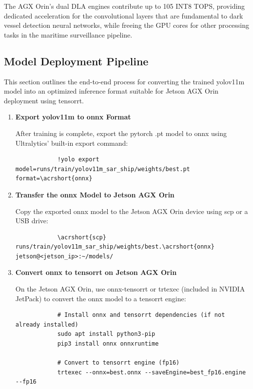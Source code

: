 \documentclass{article}
\begin{document}
	The AGX Orin's dual DLA engines contribute up to 105 INT8 TOPS, providing dedicated acceleration for the convolutional layers that are fundamental to dark vessel detection neural networks, while freeing the GPU cores for other processing tasks in the maritime surveillance pipeline.
	
	
	
	
	
	\subsection{Model Deployment Pipeline}
	This section outlines the end-to-end process for converting the trained \acrshort{yolov11m} model into an optimized inference format suitable for Jetson AGX Orin deployment using \acrshort{tensorrt}. \begin{enumerate}
		\item \textbf{Export \acrshort{yolov11m} to \acrshort{onnx} Format}
		
		After training is complete, export the \acrshort{pytorch} .pt model to \acrshort{onnx} using Ultralytics’ built-in export command:
		\begin{lstlisting}
			!yolo export model=runs/train/yolov11m_sar_ship/weights/best.pt format=\acrshort{onnx}
		\end{lstlisting}
		\item \textbf{Transfer the \acrshort{onnx} Model to Jetson AGX Orin}
		
		Copy the exported \acrshort{onnx} model to the Jetson AGX Orin device using \acrshort{scp} or a USB drive:
		\begin{lstlisting}
			\acrshort{scp} runs/train/yolov11m_sar_ship/weights/best.\acrshort{onnx} jetson@<jetson_ip>:~/models/
		\end{lstlisting}
		
		
		
		\item \textbf{Convert \acrshort{onnx} to \acrshort{tensorrt} on Jetson AGX Orin}
		
		On the Jetson AGX Orin, use \acrshort{onnx}-\acrshort{tensorrt} or trtexec (included in NVIDIA JetPack) to convert the \acrshort{onnx} model to a \acrshort{tensorrt} engine:
		\begin{lstlisting}
			# Install onnx and tensorrt dependencies (if not already installed)
			sudo apt install python3-pip
			pip3 install onnx onnxruntime
			
			# Convert to tensorrt engine (fp16)
			trtexec --onnx=best.onnx --saveEngine=best_fp16.engine --fp16
		\end{lstlisting}
		

\end{enumerate}
\end{document}

